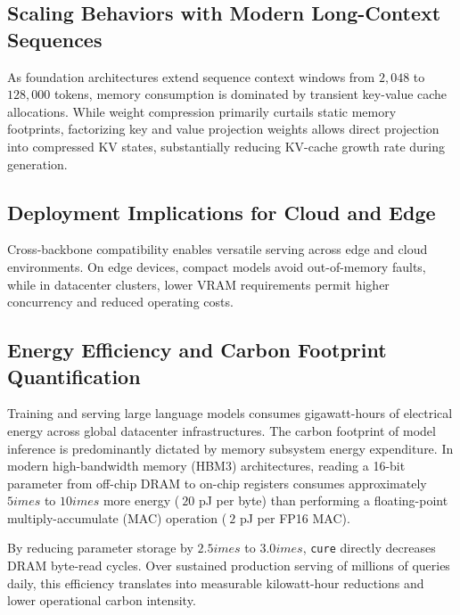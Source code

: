 \subsection{Scaling Behaviors with Modern Long-Context Sequences}
As foundation architectures extend sequence context windows from $2{,}048$ to $128{,}000$ tokens, memory consumption is dominated by transient key-value cache allocations. While weight compression primarily curtails static memory footprints, factorizing key and value projection weights allows direct projection into compressed KV states, substantially reducing KV-cache growth rate during generation.

\subsection{Deployment Implications for Cloud and Edge}
Cross-backbone compatibility enables versatile serving across edge and cloud environments. On edge devices, compact models avoid out-of-memory faults, while in datacenter clusters, lower VRAM requirements permit higher concurrency and reduced operating costs.

\subsection{Energy Efficiency and Carbon Footprint Quantification}
Training and serving large language models consumes gigawatt-hours of electrical energy across global datacenter infrastructures. The carbon footprint of model inference is predominantly dictated by memory subsystem energy expenditure. In modern high-bandwidth memory (HBM3) architectures, reading a 16-bit parameter from off-chip DRAM to on-chip registers consumes approximately $5	imes$ to $10	imes$ more energy ($~20$ pJ per byte) than performing a floating-point multiply-accumulate (MAC) operation ($~2$ pJ per FP16 MAC).

By reducing parameter storage by $2.5	imes$ to $3.0	imes$, \texttt{cure} directly decreases DRAM byte-read cycles. Over sustained production serving of millions of queries daily, this efficiency translates into measurable kilowatt-hour reductions and lower operational carbon intensity.
